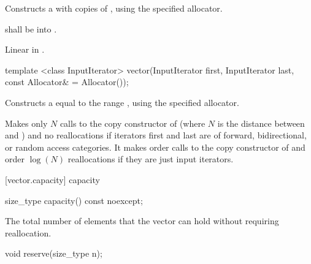 \begin{itemdescr}
\pnum
\effects Constructs a  with 
copies of , using the specified allocator.

\pnum
\requires {} shall be
 into .

\pnum
\complexity Linear in .
\end{itemdescr}

\begin{itemdecl}
template <class InputIterator>
  vector(InputIterator first, InputIterator last,
         const Allocator& = Allocator());
\end{itemdecl}

\begin{itemdescr}

\pnum
\effects Constructs a  equal to the
range , using the specified allocator.

\pnum
\complexity
Makes only $N$
calls to the copy constructor of
(where $N$
is the distance between
and
)
and no reallocations if iterators first and last are of forward, bidirectional, or random access categories.
It makes order
calls to the copy constructor of
and order
$\log(N)$
reallocations if they are just input iterators.
\end{itemdescr}

[vector.capacity]{ capacity}

%
\begin{itemdecl}
size_type capacity() const noexcept;
\end{itemdecl}

\begin{itemdescr}
\pnum
\returns
The total number of elements that the vector can hold
without requiring reallocation.
\end{itemdescr}

%
\begin{itemdecl}
void reserve(size_type n);
\end{itemdecl}


